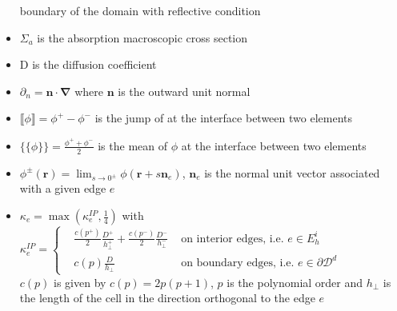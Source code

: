 \documentclass[preprint,10pt]{elsarticle}
\newcommand\bn{\boldsymbol{\nabla}}
\newcommand\br{\mathbf{r}}
\newcommand\bs{\boldsymbol}
\newcommand\ldb{\{\!\!\{}
\newcommand\rdb{\}\!\!\}}
\newcommand\llb{\llbracket}
\newcommand\rrb{\rrbracket}
\renewcommand{\(}{\left(}
\renewcommand{\)}{\right)}
\renewcommand{\[}{\left[}
\renewcommand{\]}{\right]}
\begin{document}
\begin{appendices}
\begin{itemize}
boundary of the domain with reflective condition
\item $\Sigma_a$ is the absorption macroscopic cross section
\item $\mathrm{D}$ is the diffusion coefficient
\item $\partial_n = \bs{n}\cdot \bn$ where $\bs{n}$ is the outward unit
normal
\item $\llb \phi\rrb = \phi^{+}-\phi^{-}$ is the jump of at the interface
between two elements
\item $\ldb\phi\rdb = \frac{\phi^++\phi^-}{2}$ is the mean of $\phi$ at the
interface between two elements
\item $\phi^{\pm}(\br)=\lim_{s\to 0^{\pm}}\phi(\br+s\bs{n}_e)$, $\bs{n}_e$ is
the normal unit vector associated with a given edge $e$
\item $\kappa_e = \max\(\kappa_e^{IP},\frac{1}{4}\)$ with
$\kappa_e^{IP}=\left\{
\begin{aligned}
&\frac{c(p^+)}{2}\frac{D^+}{h_{\bot}^+} + \frac{c(p^-)}{2}
\frac{D^-}{h_{\bot}^-} &\textrm{ on interior edges, i.e. }e\in E_h^i\\
&c(p)\frac{D}{h_{\bot}} & \textrm{ on boundary edges,
i.e. }e\in\partial\mathcal{D}^d
\end{aligned}
\right.$\\
$c(p)$ is given by $c(p)=2p(p+1)$, $p$ is the polynomial order and $h_{\bot}$
is the length of the cell in the direction orthogonal to the edge $e$
\end{itemize}

\end{appendices}
\end{document}
